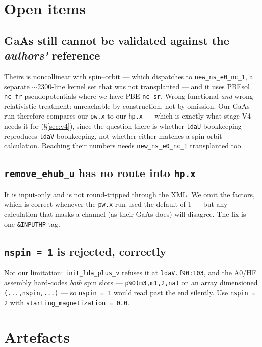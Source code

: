 \documentclass[11pt,a4paper]{article}
\newcommand{\C}[1]{\texttt{\small #1}}
\begin{document}
\section{Open items}\label{sec:open}

\subsection*{GaAs still cannot be validated against the \emph{authors'} reference}

Theirs is noncollinear with spin--orbit --- which dispatches to
\C{new_ns_e0_nc_1}, a separate $\sim$2300-line kernel set that was not
transplanted --- and it uses PBEsol \C{nc-fr} pseudopotentials where we have PBE
\C{nc_sr}. Wrong functional \emph{and} wrong relativistic treatment: unreachable
by construction, not by omission. Our GaAs run therefore compares our
\C{pw.x} to our \C{hp.x} --- which is exactly what stage V4 needs it for
(\S\ref{sec:v4}), since the question there is whether \C{ldaU} bookkeeping
reproduces \C{ldaV} bookkeeping, not whether either matches a spin-orbit
calculation. Reaching their numbers needs \C{new_ns_e0_nc_1} transplanted too.

\subsection*{\texttt{remove_ehub_u} has no route into \texttt{hp.x}}

It is input-only and is not round-tripped through the XML. We omit the factors,
which is correct whenever the \C{pw.x} run used the default of 1 --- but any
calculation that masks a channel (as their GaAs does) will disagree. The fix is
one \C{\&INPUTHP} tag.

\subsection*{\texttt{nspin = 1} is rejected, correctly}

Not our limitation: \C{init_lda_plus_v} refuses it at \C{ldaV.f90:103}, and the
A0/HF assembly hard-codes \emph{both} spin slots --- \C{p\%O(m3,m1,2,na)} on an
array dimensioned \C{(...,nspin,...)} --- so \C{nspin = 1} would read past the
end silently. Use \C{nspin = 2} with \C{starting_magnetization = 0.0}.

\section{Artefacts}
\end{document}
